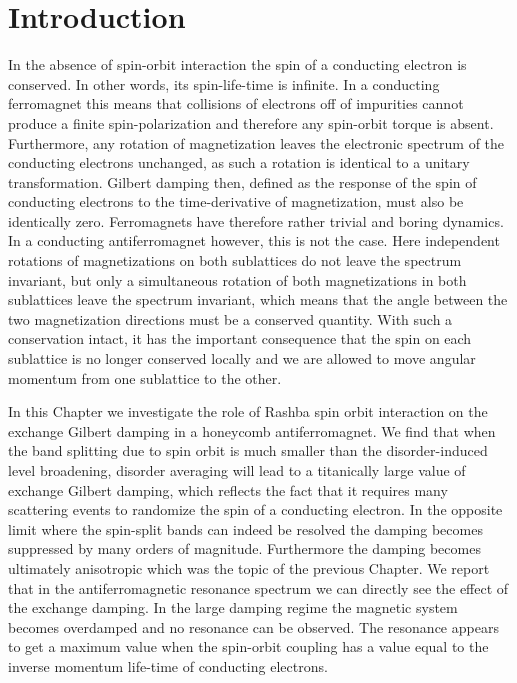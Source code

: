 \section{Introduction}
In the absence of spin-orbit interaction the spin of a conducting electron is conserved. In other words, its spin-life-time is infinite. In a conducting ferromagnet this means that collisions of electrons off of impurities cannot produce a finite spin-polarization and therefore any spin-orbit torque is absent. Furthermore, any rotation of magnetization leaves the electronic spectrum of the conducting electrons unchanged, as such a rotation is identical to a unitary transformation. Gilbert damping then, defined as the response of the spin of conducting electrons to the time-derivative of magnetization, must also be identically zero. Ferromagnets have therefore rather trivial and boring dynamics. In a conducting antiferromagnet however, this is not the case. Here independent rotations of magnetizations on both sublattices do not leave the spectrum invariant, but only a simultaneous rotation of both magnetizations in both sublattices leave the spectrum invariant, which means that the angle between the two magnetization directions must be a conserved quantity. With such a conservation intact, it has the important consequence that the spin on each sublattice is no longer conserved locally and we are allowed to move angular momentum from one sublattice to the other.   

In this Chapter we investigate the role of Rashba spin orbit interaction on the exchange Gilbert damping in a honeycomb antiferromagnet. We find that when the band splitting due to spin orbit is much smaller than the disorder-induced level broadening, disorder averaging will lead to a titanically large value of exchange Gilbert damping, which reflects the fact that it requires many scattering events to randomize the spin of a conducting electron. In the opposite limit where the spin-split bands can indeed be resolved the damping becomes suppressed by many orders of magnitude. Furthermore the damping becomes ultimately anisotropic which was the topic of the previous Chapter. We report that in the antiferromagnetic resonance spectrum we can directly see the effect of the exchange damping. In the large damping regime the magnetic system becomes overdamped and no resonance can be observed. The resonance appears to get a maximum value when the spin-orbit coupling has a value equal to the inverse momentum life-time of conducting electrons. 

